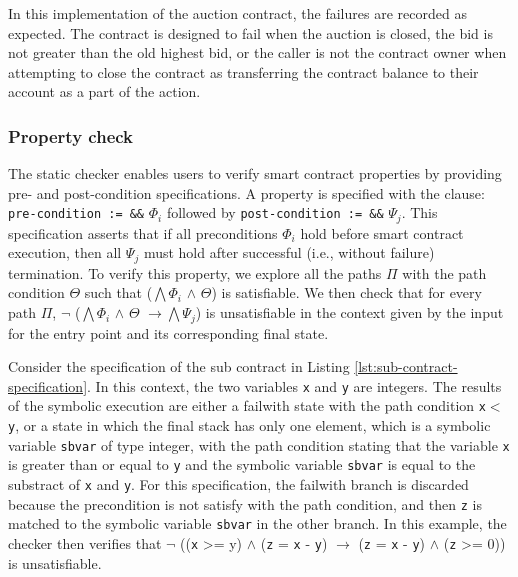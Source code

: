 \documentclass[a4paper,USenglish,cleveref, autoref, thm-restate]{lipics-v2021}
\begin{document}
In this implementation of the auction contract, the failures are
recorded as expected. The contract is designed to fail when the
auction is closed, the bid is not greater than the old highest bid, or
the caller is not the contract owner when attempting to close the
contract as transferring the contract balance to their account as a
part of the action. 

\subsubsection{Property check}
\label{sec:property-check}

The static checker enables users to verify smart contract properties
by providing pre- and post-condition specifications. A property is
specified with the clause:  \lstinline/pre-condition := &&/
$\Phi_{i}$ followed by \lstinline/post-condition := &&/ $\Psi_{j}$. This
specification asserts that if all preconditions $\Phi_{i}$ hold before
smart contract execution, then all $\Psi_{j}$ must hold after
successful (i.e., without failure) termination. To verify this
property, we explore all the paths $\Pi$ 
with the path condition $\Theta$ such that ($\bigwedge \Phi_{i}$
$\land$ $\Theta$) is satisfiable. We then check that for every path
$\Pi$, $\neg$ ($\bigwedge \Phi_{i}$ $\land$ $\Theta$ $\rightarrow \bigwedge \Psi_{j}$) is unsatisfiable in the context given by the input for the entry point
and its corresponding final state.

Consider the specification of the sub contract in Listing
\ref{lst:sub-contract-specification}. In this context, the two
variables \lstinline/x/ and \lstinline/y/ are integers. The results of
the symbolic execution are either a failwith state with the path
condition \lstinline/x/$<$\lstinline/y/,  or a state in which the
final stack has only one element, which is a symbolic variable
\lstinline/sbvar/ of type integer, with the path condition stating
that the variable \lstinline/x/ is greater than or equal to
\lstinline/y/ and the symbolic variable \lstinline/sbvar/ is equal to
the substract of \lstinline/x/ and \lstinline/y/.  For this specification,
the failwith branch is discarded because the precondition is not
satisfy with the	 path condition, and then \lstinline/z/ is matched to
the symbolic variable \lstinline/sbvar/ in the other branch. In this
example, the checker then verifies that $\neg$ ((\lstinline/x/ >= y) $\land$ (\lstinline/z/
= \lstinline/x/ - \lstinline/y/) $\rightarrow$ (\lstinline/z/ = \lstinline/x/ - \lstinline/y/) $\land$ (\lstinline/z/ >= 0)) is unsatisfiable.
\end{document}
